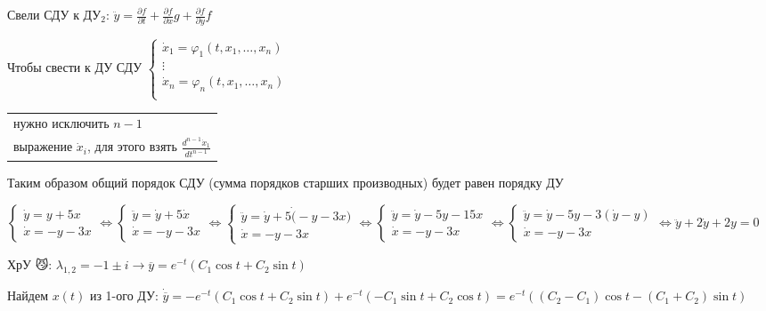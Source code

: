 \documentclass[12pt]{article}
\begin{document}
    Свели СДУ к ДУ$\displaystyle _2$: $\displaystyle \ddot y = \frac{\partial f}{\partial t} + \frac{\partial f}{\partial x}g + \frac{\partial f}{\partial y}f$

    \Nota Чтобы свести к ДУ СДУ $\displaystyle \begin{cases}
         \dot x_1 = \varphi_1(t, x_1, \dots, x_n) \\
         \vdots \\
         \dot x_n = \varphi_n(t, x_1, \dots, x_n) \\
    \end{cases}$ \begin{tabular}{l}\\ нужно исключить $n - 1$ \\ выражение $\displaystyle \dot x_i$, для этого взять $\displaystyle \frac{d^{n - 1} \dot x_1}{dt^{n - 1}}$\end{tabular}

    Таким образом общий порядок СДУ (сумма порядков старших производных) будет равен порядку ДУ

    \Ex
    $\begin{cases}
        \dot y = y + 5x \\
        \dot x = -y - 3x
    \end{cases} \Longleftrightarrow
    \begin{cases}
        \ddot y = \dot y + 5\dot x \\
        \dot x = -y - 3x
    \end{cases} \Longleftrightarrow
    \begin{cases}
        \ddot y = \dot y + 5\dot (-y - 3x) \\
        \dot x = -y - 3x
    \end{cases} \Longleftrightarrow
    \begin{cases}
        \ddot y = \dot y - 5y - 15x \\
        \dot x = -y - 3x
    \end{cases} \Longleftrightarrow
    \begin{cases}
        \ddot y = \dot y - 5y - 3(\dot y - y) \\
        \dot x = -y - 3x
    \end{cases} \Longleftrightarrow \ddot y + 2\dot y + 2y = 0$

    ХрУ 😼: $\displaystyle \lambda_{1,2} = -1 \pm i \rightarrow \overline{y} = e^{-t} (C_1 \cos t + C_2 \sin t)$

    Найдем $x(t)$ из 1-ого ДУ: $\displaystyle \dot{\overline{y}} = -e^{-t} (C_1 \cos t + C_2 \sin t) + e^{-t} (-C_1 \sin t + C_2 \cos t) = e^{-t} ((C_2 - C_1) \cos t - (C_1 + C_2) \sin t)$
\end{document}
